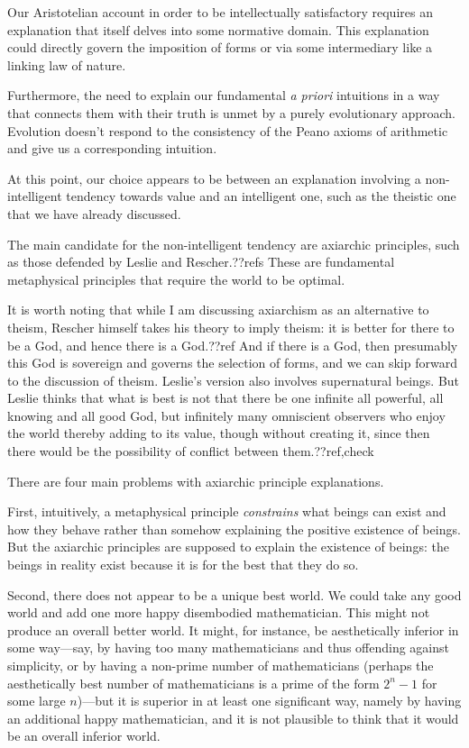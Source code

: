 Our Aristotelian account in order to be intellectually satisfactory requires an explanation that itself delves into some 
normative domain. This explanation could directly govern the imposition of forms or via some intermediary like a linking
law of nature. 

Furthermore, the need to explain our fundamental \textit{a priori} intuitions in a way that connects them with their truth
is unmet by a purely evolutionary approach. Evolution doesn't respond to the consistency of the Peano axioms of arithmetic 
and give us a corresponding intuition.

At this point, our choice appears to be between an explanation involving a non-intelligent tendency towards value and an intelligent one,
such as the theistic one that we have already discussed.

The main candidate for the non-intelligent tendency are axiarchic principles, such as those defended by Leslie and Rescher.??refs
These are fundamental metaphysical principles that require the world to be optimal. 

It is worth noting that while I am discussing axiarchism as an alternative to theism, Rescher himself takes his theory to
imply theism: it is better for there to be a God, and hence there is a God.??ref And if there is a God, then presumably this God
is sovereign and governs the selection of forms, and we can skip forward to the discussion of theism. Leslie's version also
involves supernatural beings. But Leslie thinks that what is best is not that there be one infinite all powerful, all knowing
and all good God, but infinitely many omniscient observers who enjoy the world thereby adding to its value, though without
creating it, since then there would be the possibility of conflict between them.??ref,check

There are four main problems with axiarchic principle explanations.

First, intuitively, a metaphysical principle \textit{constrains} what beings can exist and how they behave rather than somehow 
explaining the positive existence of beings. But the axiarchic principles are supposed to explain the existence of beings: the beings
in reality exist because it is for the best that they do so. 

Second, there does not appear to be a unique best world. We could take any good world and add one more happy disembodied mathematician.
This might not produce an overall better world. It might, for instance, be aesthetically inferior in some way---say, by having too many
mathematicians and thus offending against simplicity, or by having a non-prime number of mathematicians (perhaps the aesthetically best 
number of mathematicians is a prime of the form $2^n-1$ for some large $n$)---but it is superior in at least one significant way, namely 
by having an additional happy mathematician, and it is not plausible to think that it would be an overall inferior world.

